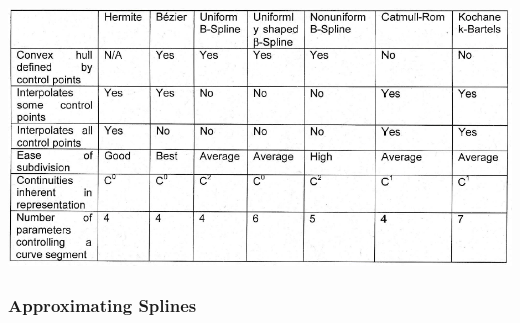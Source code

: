 \documentclass[12pt]{article}
\begin{document}
\includegraphics[scale=0.6]{3_25}

\subsubsection*{Approximating Splines}
\end{document}
